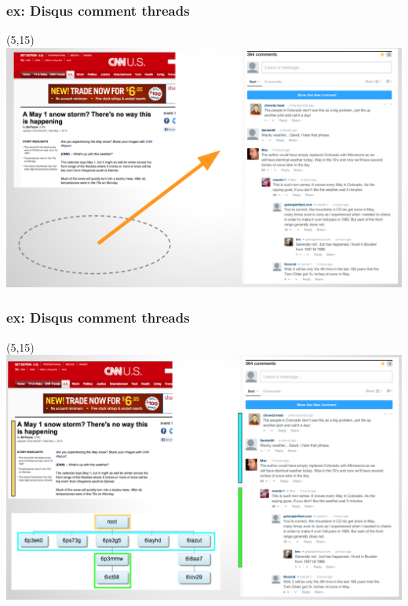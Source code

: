 \documentclass{beamer}
\begin{document}
\begin{frame} \frametitle{ex: Disqus comment threads}

\begin{textblock}{1}(5,15)
	\includegraphics[scale=0.21]{./imgs/disqus1.png}
\end{textblock}

\end{frame}

%
\begin{frame} \frametitle{ex: Disqus comment threads}

\begin{textblock}{1}(5,15)
	\includegraphics[scale=0.21]{./imgs/disqus3.png}
\end{textblock}

\end{frame}
\end{document}
